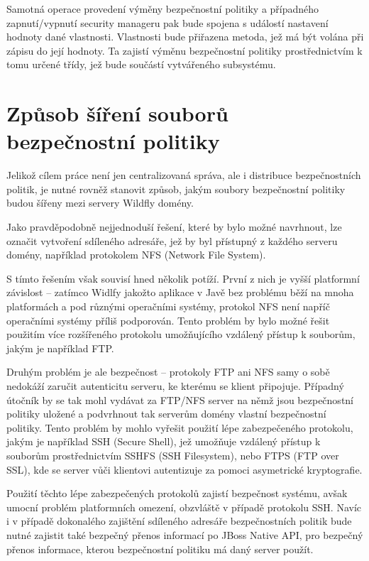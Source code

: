 Samotná operace provedení výměny bezpečnostní politiky a případného zapnutí/vypnutí security manageru pak bude spojena s událostí nastavení hodnoty dané vlastnosti. Vlastnosti bude přiřazena metoda, jež má být volána při zápisu do její hodnoty. Ta zajistí výměnu bezpečnostní politiky prostřednictvím k tomu určené třídy, jež bude součástí vytvářeného subsystému.

\section{Způsob šíření souborů bezpečnostní politiky}

Jelikož cílem práce není jen centralizovaná správa, ale i distribuce bezpečnostních politik, je nutné rovněž stanovit způsob, jakým soubory bezpečnostní politiky budou šířeny mezi servery Wildfly domény.

Jako pravděpodobně nejjednoduší řešení, které by bylo možné navrhnout, lze označit vytvoření sdíleného adresáře, jež by byl přístupný z každého serveru domény, například protokolem NFS (Network File System).

S tímto řešením však souvisí hned několik potíží. První z nich je vyšší platformní závislost -- zatímco Widlfy jakožto aplikace v Javě bez problému běží na mnoha platformách a pod různými operačními systémy, protokol NFS není napříč operačními systémy příliš podporován. Tento problém by bylo možné řešit použitím více rozšířeného protokolu umožňujícího vzdálený přístup k souborům, jakým je například FTP.

Druhým problém je ale bezpečnost -- protokoly FTP ani NFS samy o sobě nedokáží zaručit autenticitu serveru, ke kterému se klient připojuje. Případný útočník by se tak mohl vydávat za FTP/NFS server na němž jsou bezpečnostní politiky uložené a podvrhnout tak serverům domény vlastní bezpečnostní politiky. Tento problém by mohlo vyřešit použití lépe zabezpečeného protokolu, jakým je například SSH (Secure Shell), jež umožňuje vzdálený přístup k souborům prostřednictvím SSHFS (SSH Filesystem), nebo FTPS (FTP over SSL), kde se server vůči klientovi autentizuje za pomoci asymetrické kryptografie. \cite[3]{ssh}

Použití těchto lépe zabezpečených protokolů zajistí bezpečnost systému, avšak umocní problém platformních omezení, obzvláště v případě protokolu SSH. Navíc i v případě dokonalého zajištění sdíleného adresáře bezpečnostních politik bude nutné zajistit také bezpečný přenos informací po JBoss Native API, pro bezpečný přenos informace, kterou bezpečnostní politiku má daný server použít.

